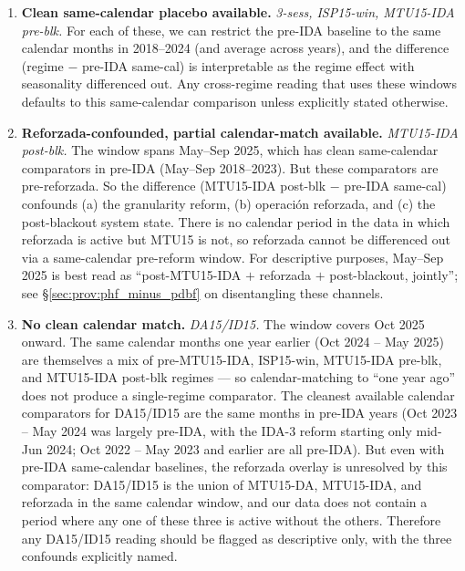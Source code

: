 \documentclass[11pt,a4paper]{article}
\begin{document}
\begin{enumerate}\setlength{\itemsep}{2pt}
\item \textbf{Clean same-calendar placebo available.} \emph{3-sess, ISP15-win, MTU15-IDA pre-blk.} For each of these, we can restrict the pre-IDA baseline to the same calendar months in 2018--2024 (and average across years), and the difference (regime $-$ pre-IDA same-cal) is interpretable as the regime effect with seasonality differenced out. Any cross-regime reading that uses these windows defaults to this same-calendar comparison unless explicitly stated otherwise.

\item \textbf{Reforzada-confounded, partial calendar-match available.} \emph{MTU15-IDA post-blk.} The window spans May--Sep 2025, which has clean same-calendar comparators in pre-IDA (May--Sep 2018--2023). But these comparators are pre-reforzada. So the difference (MTU15-IDA post-blk $-$ pre-IDA same-cal) confounds (a) the granularity reform, (b) operación reforzada, and (c) the post-blackout system state. There is no calendar period in the data in which reforzada is active but MTU15 is not, so reforzada cannot be differenced out via a same-calendar pre-reform window. For descriptive purposes, May--Sep 2025 is best read as ``post-MTU15-IDA $+$ reforzada $+$ post-blackout, jointly''; see \S\ref{sec:prov:phf_minus_pdbf} on disentangling these channels.

\item \textbf{No clean calendar match.} \emph{DA15/ID15.} The window covers Oct 2025 onward. The same calendar months one year earlier (Oct 2024 -- May 2025) are themselves a mix of pre-MTU15-IDA, ISP15-win, MTU15-IDA pre-blk, and MTU15-IDA post-blk regimes --- so calendar-matching to ``one year ago'' does not produce a single-regime comparator. The cleanest available calendar comparators for DA15/ID15 are the same months in pre-IDA years (Oct 2023 -- May 2024 was largely pre-IDA, with the IDA-3 reform starting only mid-Jun 2024; Oct 2022 -- May 2023 and earlier are all pre-IDA). But even with pre-IDA same-calendar baselines, the reforzada overlay is unresolved by this comparator: DA15/ID15 is the union of MTU15-DA, MTU15-IDA, and reforzada in the same calendar window, and our data does not contain a period where any one of these three is active without the others. Therefore any DA15/ID15 reading should be flagged as descriptive only, with the three confounds explicitly named.
\end{enumerate}
\end{document}
